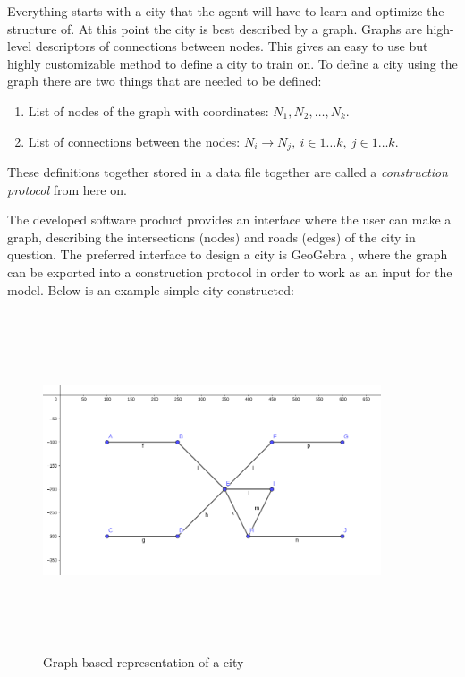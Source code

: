 \documentclass[
]{elteikthesis}[2023/04/10]
\begin{document}
Everything starts with a city that the agent will have to learn and
optimize the structure of. At this point the city is best described
by a graph. Graphs are high-level descriptors of connections between
nodes. This gives an easy to use but highly customizable method to
define a city to train on. To define a city using the graph there
are two things that are needed to be defined: 
\begin{enumerate}
\item List of nodes of the graph with coordinates: $N_{1},N_{2},\ldots,N_{k}$.
\item List of connections between the nodes: $N_{i}\rightarrow N_{j},\ i\in1\dots k,\ j\in1\dots k$.
\end{enumerate}
These definitions together stored in a data file together are called
a \emph{construction protocol} from here on.

The developed software product provides an interface where the user
can make a graph, describing the intersections (nodes) and roads (edges)
of the city in question. The preferred interface to design a city is GeoGebra
\cite{geogebra2017geogebra}, where the graph can be exported into a construction 
protocol in order to work as an input for the model. Below is an example simple
city constructed:

\begin{figure}[H]
\begin{centering}
\includegraphics[width=10cm,height=10cm,keepaspectratio]{images/simple_graph}
\par\end{centering}
\caption{Graph-based representation of a city}

\end{figure}
\end{document}
